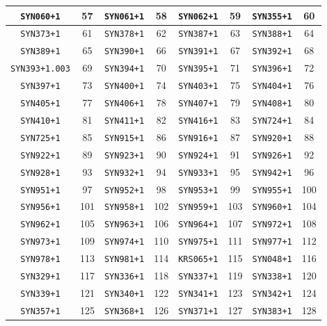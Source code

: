 \documentclass[./main.tex]{subfiles}
\begin{document}
\begin{table}[H]
\begin{tabularx}{\textwidth}{|c|c|c|c|c|c|c|c|}
\hline
\texttt{SYN060+1} & 57 & \texttt{SYN061+1} & 58 & \texttt{SYN062+1} & 59 & \texttt{SYN355+1} & 60\\
\hline
\texttt{SYN373+1} & 61 & \texttt{SYN378+1} & 62 & \texttt{SYN387+1} & 63 & \texttt{SYN388+1} & 64\\
\hline
\texttt{SYN389+1} & 65 & \texttt{SYN390+1} & 66 & \texttt{SYN391+1} & 67 & \texttt{SYN392+1} & 68\\
\hline
\texttt{SYN393+1.003} & 69 & \texttt{SYN394+1} & 70 & \texttt{SYN395+1} & 71 & \texttt{SYN396+1} & 72\\
\hline
\texttt{SYN397+1} & 73 & \texttt{SYN400+1} & 74 & \texttt{SYN403+1} & 75 & \texttt{SYN404+1} & 76\\
\hline
\texttt{SYN405+1} & 77 & \texttt{SYN406+1} & 78 & \texttt{SYN407+1} & 79 & \texttt{SYN408+1} & 80\\
\hline
\texttt{SYN410+1} & 81 & \texttt{SYN411+1} & 82 & \texttt{SYN416+1} & 83 & \texttt{SYN724+1} & 84\\
\hline
\texttt{SYN725+1} & 85 & \texttt{SYN915+1} & 86 & \texttt{SYN916+1} & 87 & \texttt{SYN920+1} & 88\\
\hline
\texttt{SYN922+1} & 89 & \texttt{SYN923+1} & 90 & \texttt{SYN924+1} & 91 & \texttt{SYN926+1} & 92\\
\hline
\texttt{SYN928+1} & 93 & \texttt{SYN932+1} & 94 & \texttt{SYN933+1} & 95 & \texttt{SYN942+1} & 96\\
\hline
\texttt{SYN951+1} & 97 & \texttt{SYN952+1} & 98 & \texttt{SYN953+1} & 99 & \texttt{SYN955+1} & 100\\
\hline
\texttt{SYN956+1} & 101 & \texttt{SYN958+1} & 102 & \texttt{SYN959+1} & 103 & \texttt{SYN960+1} & 104\\
\hline
\texttt{SYN962+1} & 105 & \texttt{SYN963+1} & 106 & \texttt{SYN964+1} & 107 & \texttt{SYN972+1} & 108\\
\hline
\texttt{SYN973+1} & 109 & \texttt{SYN974+1} & 110 & \texttt{SYN975+1} & 111 & \texttt{SYN977+1} & 112\\
\hline
\texttt{SYN978+1} & 113 & \texttt{SYN981+1} & 114 & \texttt{KRS065+1} & 115 & \texttt{SYN048+1} & 116\\
\hline
\texttt{SYN329+1} & 117 & \texttt{SYN336+1} & 118 & \texttt{SYN337+1} & 119 & \texttt{SYN338+1} & 120\\
\hline
\texttt{SYN339+1} & 121 & \texttt{SYN340+1} & 122 & \texttt{SYN341+1} & 123 & \texttt{SYN342+1} & 124\\
\hline
\texttt{SYN357+1} & 125 & \texttt{SYN368+1} & 126 & \texttt{SYN371+1} & 127 & \texttt{SYN383+1} & 128\\

\end{tabularx}
\end{table}
\end{document}
